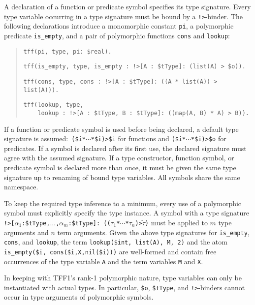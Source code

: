 A declaration of a function or predicate symbol specifies its type signature.
Every type variable occurring in a type signature must be bound by a
{\tt !>}-binder.
The following declarations introduce a monomorphic
constant {\tt pi}, a polymorphic predicate
{\tt is\_empty}, and a pair of polymorphic functions {\tt cons} and {\tt lookup}:
\begin{quote}
\verb+tff(pi, type, pi: $real).+
\par
\verb+tff(is_empty, type, is_empty : !>[A : $tType]: (list(A) > $o)).+\kern-10mm
\par
\pagebreak[2] %
\verb+tff(cons, type, cons : !>[A : $tType]: ((A * list(A)) > list(A))).+
\par
\pagebreak[2] %
\verb+tff(lookup, type,+\\
\verb+    lookup : !>[A : $tType, B : $tType]: ((map(A, B) * A) > B)).+\kern-10mm
\end{quote}
If a function or predicate symbol is used before being declared, a
default type signature is assumed:\ {\tt (\$i\;*\;${\cdots}$\;*\;\$i)\;>\;\$i}
for functions and {\tt (\$i\;*\;${\cdots}$\;*\;\$i)\;>\;\$o} for predicates.
If a symbol is declared after its first use, the declared signature
must agree with the assumed signature.
%
If a type constructor, function symbol, or predicate symbol is declared more
than once, it must be given the same type signature up to renaming of bound
type variables.
All symbols share the same namespace.

 To keep the required type
inference to a minimum, every use of a polymorphic symbol must explicitly
specify the type instance. A symbol with a type signature
{{\tt !>[$\alpha_1$\;:\;\$tType,\;${\dots}$,\;$\alpha_m$\;:\;\$tType]:\;%
(($\tau_1$\;*\;${\cdots}$\;*\;$\tau_n$)\;>\;$\tilde \tau$)}}
must be applied to $m$ type arguments and $n$ term arguments. Given the above
type signatures for {\tt is\_empty}, {\tt cons}, and {\tt lookup}, the term
\hbox{\tt lookup(\$int,\;\,list(A),\;\,M,\;\,2)}
and the atom
\hbox{\tt is\_empty(\$i,\;\,cons(\$i,\;X,\;nil(\$i)))}
are well-formed and contain free occurrences of the type variable {\tt A}
and the term variables {\tt M} and {\tt X}.

In keeping with TFF1's rank-1 polymorphic nature, type variables can only be
instantiated with actual types. In particular, \verb+$o+, \verb+$tType+,
and {\tt !>}-binders cannot occur in type arguments of polymorphic symbols.

